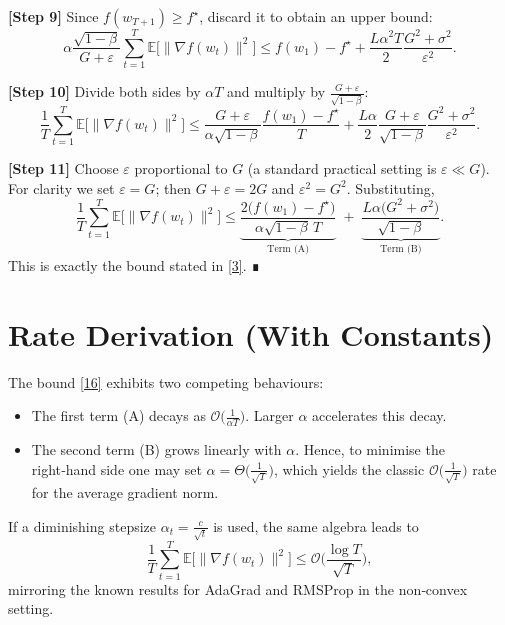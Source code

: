 \documentclass{article}
\begin{document}
\noindent\textbf{[Step 9]} Since $f(w_{T+1})\ge f^{\star}$, discard it to obtain an upper bound:
\[
\alpha\frac{\sqrt{1-\beta}}{G+\varepsilon}
\sum_{t=1}^{T}\mathbb{E}\big[\|\nabla f(w_{t})\|^{2}\big]
\le
f(w_{1})-f^{\star}
+ \frac{L\alpha^{2}T}{2}\frac{G^{2}+\sigma^{2}}{\varepsilon^{2}}.
\tag{14}
\]

\noindent\textbf{[Step 10]} Divide both sides by $\alpha T$ and multiply by $\frac{G+\varepsilon}{\sqrt{1-\beta}}$:
\[
\frac{1}{T}\sum_{t=1}^{T}\mathbb{E}\big[\|\nabla f(w_{t})\|^{2}\big]
\le
\frac{G+\varepsilon}{\alpha\sqrt{1-\beta}}\frac{f(w_{1})-f^{\star}}{T}
+\frac{L\alpha}{2}\frac{G+\varepsilon}{\sqrt{1-\beta}}\frac{G^{2}+\sigma^{2}}{\varepsilon^{2}}.
\tag{15}
\]

\noindent\textbf{[Step 11]} Choose $\varepsilon$ proportional to $G$ (a standard practical setting is $\varepsilon\ll G$). For clarity we set $\varepsilon=G$; then $G+\varepsilon=2G$ and $\varepsilon^{2}=G^{2}$. Substituting,
\[
\frac{1}{T}\sum_{t=1}^{T}\mathbb{E}\big[\|\nabla f(w_{t})\|^{2}\big]
\le
\underbrace{\frac{2\big(f(w_{1})-f^{\star}\big)}{\alpha\sqrt{1-\beta}\,T}}_{\text{Term (A)}}
\;+\;
\underbrace{\frac{L\alpha\big(G^{2}+\sigma^{2}\big)}{\sqrt{1-\beta}}}_{\text{Term (B)}} .
\tag{16}
\]
This is exactly the bound stated in \eqref{3}. ∎

\section*{Rate Derivation (With Constants)}
The bound \eqref{16} exhibits two competing behaviours:

\begin{itemize}
\item The first term (A) decays as $\mathcal{O}\!\big(\tfrac{1}{\alpha T}\big)$. Larger $\alpha$ accelerates this decay.
\item The second term (B) grows linearly with $\alpha$. Hence, to minimise the right‑hand side one may set $\alpha = \Theta\big(\tfrac{1}{\sqrt{T}}\big)$, which yields the classic $\mathcal{O}\!\big(\tfrac{1}{\sqrt{T}}\big)$ rate for the average gradient norm.
\end{itemize}
If a diminishing stepsize $\alpha_{t}= \frac{c}{\sqrt{t}}$ is used, the same algebra leads to
\[
\frac{1}{T}\sum_{t=1}^{T}\mathbb{E}\big[\|\nabla f(w_{t})\|^{2}\big]
\le
\mathcal{O}\!\Big(\frac{\log T}{\sqrt{T}}\Big),
\]
mirroring the known results for AdaGrad and RMSProp in the non‑convex setting.
\end{document}

